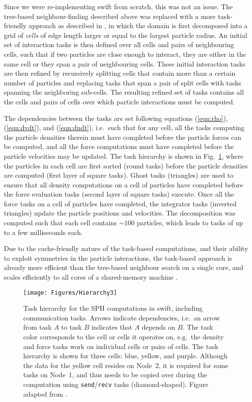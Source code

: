 \documentclass{sig-alternate-05-2015}
\newcommand{\eqn}[1] {(\ref{eqn:#1})}
\newcommand{\swift}{{\sc swift}\xspace}
\begin{document}
Since we were re-implementing \swift from scratch, this was not an issue.
The tree-based neighbour-finding described above was replaced with a more
task-friendly approach as described in \cite{ref:Gonnet2015}, in which
the domain is first decomposed into a grid of {\em cells} of edge length
larger or equal to the largest particle radius.
An initial set of interaction tasks is then defined over all cells and
pairs of neighbouring cells, such that if two particles are close enough to interact,
they are either in the same cell or they span a pair of neighbouring cells.
These initial interaction tasks are then refined by recursively
splitting cells that contain more than a certain number of particles
and replacing tasks that span a pair of split cells with tasks
spanning the neighboring sub-cells.
The resulting refined set of tasks contains all the cells and pairs of cells
over which particle interactions must be computed.

The dependencies between the tasks are set following
equations \eqn{rho}, \eqn{dvdt}, and \eqn{dudt}, i.e.~such that for any cell,
all the tasks computing the particle densities therein must have
completed before the particle forces can be computed, and all the
force computations must have completed before the particle velocities
may be updated.
The task hierarchy is shown in Fig.~\ref{tasks}, where the particles in each
cell are first sorted (round tasks) before the particle densities
are computed (first layer of square tasks).
Ghost tasks (triangles) are used to ensure that all density computations
on a cell of particles have completed before the force evaluation tasks
(second layer of square tasks) execute.
Once all the force tasks on a cell of particles have completed,
the integrator tasks (inverted triangles) update the particle positions 
and velocities.
The decomposition was computed such that each cell contains $\sim 100$ particles,
which leads to tasks of up to a few milliseconds each.

Due to the cache-friendly nature of the task-based computations, 
and their ability to exploit symmetries in the particle interactions,
the task-based approach is already more efficient than the tree-based
neighbour search on a single core, and scales efficiently to all
cores of a shared-memory machine \cite{ref:Gonnet2015}.

\begin{figure}
\centering
\texttt{[image: Figures/Hierarchy3]}
\caption{Task hierarchy for the SPH computations in \swift,
  including communication tasks.
  Arrows indicate dependencies,
  i.e.~an arrow from task $A$ to task $B$ indicates that $A$
  depends on $B$. 
  The task color corresponds to the cell or
  cells it operates on, e.g.~the density and force tasks work
  on individual cells or pairs of cells.
  The task hierarchy is shown for three cells: blue, yellow,
  and purple. Although the data for the yellow cell resides on
  Node~2, it is required for some tasks on Node~1, and thus needs
  to be copied over  during
  the computation using {\tt send}/{\tt recv} tasks
  (diamond-shaped). \newline 
  Figure adapted from \cite{ref:Gonnet2015}.
  }
\label{tasks}
\end{figure}  
\end{document}
